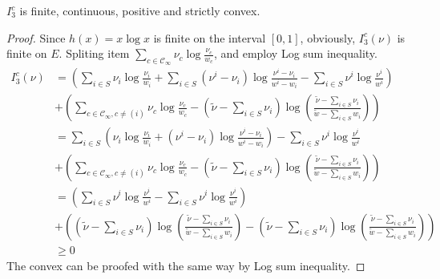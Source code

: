 \documentclass[11pt,en,cite=authoryear]{elegantpaper}
\begin{document}
\begin{corollary}
    $I_3^c$ is  finite, continuous, positive and strictly convex.
\end{corollary}
\begin{proof}
    Since $h(x) = x \log x$ is finite on the interval $[0, 1]$, obviously, $I^c_3(\nu)$ is finite on $E$.
    Spliting item $\sum_{c \in \mathcal{C}_{\infty}} \nu_{c} \log \frac{\nu_{c}}{w_c}$, and employ Log sum inequality.
    \begin{align*}
        I^c_3(\nu) 
        &= \left(\sum_{i\in S} \nu_{i}\log \frac{\nu_{i}}{w_i} + \sum_{i\in S}(\nu^i - \nu_i)\log \frac{\nu^i - \nu_i}{w^i - w_i} 
        - \sum_{i\in S} \nu^i \log \frac{\nu^i}{w^i} \right)\\
        &+ \left(\sum_{c \in \mathcal{C}_{\infty}, c\neq (i)} \nu_{c} \log \frac{\nu_{c}}{w_c} 
        -(\tilde{\nu} - \sum_{i\in S}\nu_i)\log(\frac{\tilde{\nu} - \sum_{i\in S}\nu_i}{\tilde{w} - \sum_{i\in S}w_i}) \right)\\
        &= \sum_{i\in S} \left(\nu_{i}\log \frac{\nu_{i}}{w_i} 
        + (\nu^i - \nu_i)\log \frac{\nu^i - \nu_i}{w^i - w_i} \right)
        - \sum_{i\in S} \nu^i \log \frac{\nu^i}{w^i} \\
        &+ \left(\sum_{c \in \mathcal{C}_{\infty}, c\neq (i)} \nu_{c} \log \frac{\nu_{c}}{w_c} 
        -(\tilde{\nu} - \sum_{i\in S}\nu_i)\log(\frac{\tilde{\nu} - \sum_{i\in S}\nu_i}{\tilde{w} - \sum_{i\in S}w_i}) \right)\\ 
        &= \left(\sum_{i\in S} \nu^i \log \frac{\nu^i}{w^i} 
        - \sum_{i\in S} \nu^i \log \frac{\nu^i}{w^i} \right)\\
        &+ \left( (\tilde{\nu} - \sum_{i\in S}\nu_i)\log(\frac{\tilde{\nu} - \sum_{i\in S}\nu_i}{\tilde{w} - \sum_{i\in S}w_i}) 
        -(\tilde{\nu} - \sum_{i\in S}\nu_i)\log(\frac{\tilde{\nu} - \sum_{i\in S}\nu_i}{\tilde{w} - \sum_{i\in S}w_i}) \right)\\
        &\ge 0
    \end{align*}
    The convex can be proofed with the same way by Log sum inequality.
\end{proof}
\end{document}
